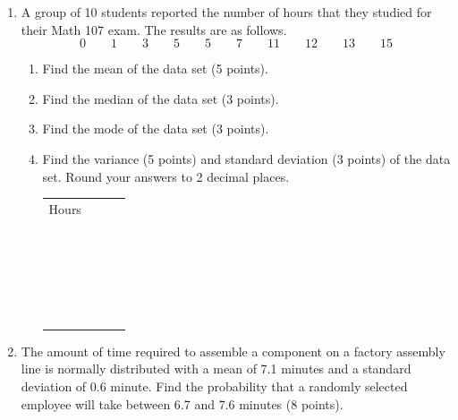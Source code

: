 \documentclass[12pt]{article}
\begin{document}
\begin{enumerate}
\newpage
\item
A group of 10 students reported the number of hours that they studied for their Math 107 exam.  The results are as follows.
\[0\qquad1\qquad3\qquad5\qquad5\qquad7\qquad11\qquad12\qquad13\qquad15\]
\begin{enumerate}
\item Find the mean of the data set (5 points).
\vspace{.7 in}
\item Find the median of the data set (3 points).
\vspace{.4 in}
\item Find the mode of the data set (3 points).
\vspace{.4 in}
\item Find the variance (5 points) and standard deviation (3 points) of the data set.  Round your answers to 2 decimal places.
\begin{center}
\begin{tabular}{|c|c|l|l|}
 \hline
Hours & \qquad\qquad\qquad\qquad & \qquad\qquad\qquad\qquad\\
&&\\
\hline
&&\\
 & & \\
\hline
&&\\
 & & \\
\hline
&&\\
 & & \\
\hline
&&\\
 & & \\
\hline
&&\\
 & & \\
 \hline
&&\\
 & & \\
 \hline
&&\\
 & & \\
 \hline
&&\\
 & & \\
 \hline
&&\\
 & & \\
 \hline
& & \\
&&\\
\hline
& & \\
&&\\
\hline
\end{tabular}
\end{center}

\end{enumerate}

\item The amount of time required to assemble a component on a factory assembly line is normally distributed with a mean of 7.1 minutes and a standard deviation of 0.6 minute.  Find the probability that a randomly selected employee will take between 6.7 and 7.6 minutes (8 points).
\vspace{2.0 in}


\end{enumerate}
\end{document}
